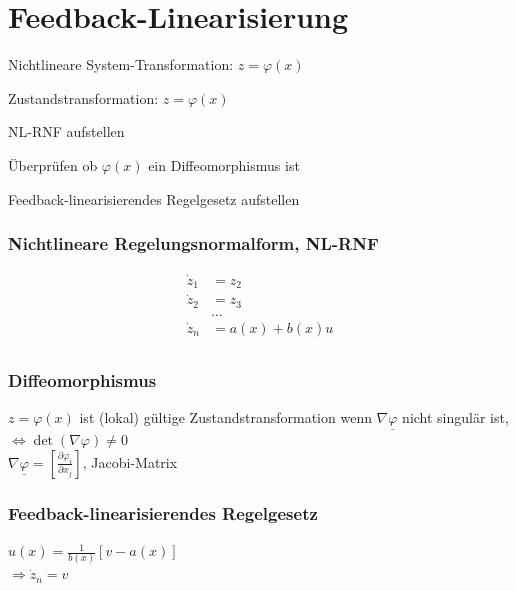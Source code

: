 \documentclass[german]{latex4ei/latex4ei_sheet}
\begin{document}
\section{Feedback-Linearisierung}
\begin{sectionbox}
\begin{cookbox}{Nichtlineare System-Transformation: $z = \varphi (x)$}
  \item Zustandstransformation: $z = \varphi(x)$
  \item NL-RNF aufstellen
  \item Überprüfen ob $\varphi(x)$ ein Diffeomorphismus ist
  \item Feedback-linearisierendes Regelgesetz aufstellen
\end{cookbox}

\subsubsection{Nichtlineare Regelungsnormalform, NL-RNF}
\begin{align*}
  \dot{z}_1 &= z_2 \\
  \dot{z}_2 &= z_3 \\
            &\dots \\
  \dot{z}_n &= a(x) + b(x) u \\
\end{align*}

\subsubsection{Diffeomorphismus}
$z = \varphi(x)$ ist (lokal) gültige Zustandstransformation wenn $\nabla \underline{\varphi}$ nicht singulär ist, $\Leftrightarrow \det(\nabla \varphi) \neq 0$ \\
$\nabla \underline{\varphi} = \left[ \frac{\partial \varphi_i}{\partial x_j} \right]$, Jacobi-Matrix

\subsubsection{Feedback-linearisierendes Regelgesetz}
$u(x) = \frac{1}{b(x)}[v - a(x)]$ \\
$\Rightarrow \dot{z}_n = v $
\end{sectionbox}
\end{document}
